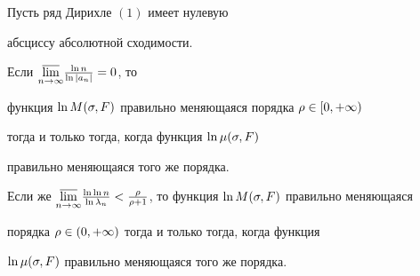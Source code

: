 \begin{thm}


Пусть ряд Дирихле $(1)$ имеет нулевую


абсциссу абсолютной сходимости.


Если $\underset{n\to\infty}{\varlimsup}{}\frac{\ln n}{\ln |a_n|}=0$, то


функция $\ln M(\sigma,F)$ правильно меняющаяся порядка $\rho\in [0,+\infty)$


тогда и только тогда, когда функция $\ln \mu(\sigma,F)$


правильно меняющаяся того же порядка.


Если же $\underset{n\to\i}{\varlimsup}{}\frac{\ln \ln n}{\ln \la_n}<


\frac{\r}{\r+1}$, то функция $\ln M(\s,F)$ правильно меняющаяся 


порядка $\rho\in (0,+\infty)$ тогда и только тогда, когда функция 


$\ln \mu(\sigma,F)$ правильно меняющаяся того же порядка.


\end{thm}





